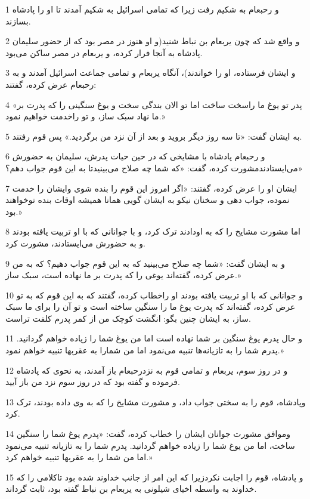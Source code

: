 \par 1 و رحبعام به شکیم رفت زیرا که تمامی اسرائیل به شکیم آمدند تا او را پادشاه بسازند.
\par 2 و واقع شد که چون یربعام بن نباط شنید(و او هنوز در مصر بود که از حضور سلیمان پادشاه به آنجا فرار کرده، و یربعام در مصر ساکن می‌بود.
\par 3 و ایشان فرستاده، او را خواندند)، آنگاه یربعام و تمامی جماعت اسرائیل آمدند و به رحبعام عرض کرده، گفتند:
\par 4 «پدر تو یوغ ما راسخت ساخت اما تو الان بندگی سخت و یوغ سنگینی را که پدرت بر ما نهاد سبک ساز، و تو راخدمت خواهیم نمود.»
\par 5 به ایشان گفت: «تا سه روز دیگر بروید و بعد از آن نزد من برگردید.» پس قوم رفتند.
\par 6 و رحبعام پادشاه با مشایخی که در حین حیات پدرش، سلیمان به حضورش می‌ایستادندمشورت کرده، گفت: «که شما چه صلاح می‌بینیدتا به این قوم جواب دهم؟»
\par 7 ایشان او را عرض کرده، گفتند: «اگر امروز این قوم را بنده شوی وایشان را خدمت نموده، جواب دهی و سخنان نیکو به ایشان گویی همانا همیشه اوقات بنده توخواهند بود.»
\par 8 اما مشورت مشایخ را که به اودادند ترک کرد، و با جوانانی که با او تربیت یافته بودند و به حضورش می‌ایستادند، مشورت کرد.
\par 9 و به ایشان گفت: «شما چه صلاح می‌بینید که به این قوم جواب دهیم؟ که به من عرض کرده، گفته‌اند یوغی را که پدرت بر ما نهاده است، سبک ساز.»
\par 10 و جوانانی که با او تربیت یافته بودند او راخطاب کرده، گفتند که به این قوم که به تو عرض کرده، گفته‌اند که پدرت یوغ ما را سنگین ساخته است و تو آن را برای ما سبک ساز، به ایشان چنین بگو: انگشت کوچک من از کمر پدرم کلفت تراست.
\par 11 و حال پدرم یوغ سنگین بر شما نهاده است اما من یوغ شما را زیاده خواهم گردانید. پدرم شما را به تازیانه‌ها تنبیه می‌نمود اما من شمارا به عقربها تنبیه خواهم نمود.»
\par 12 و در روز سوم، یربعام و تمامی قوم به نزدرحبعام باز آمدند، به نحوی که پادشاه فرموده و گفته بود که در روز سوم نزد من باز آیید.
\par 13 وپادشاه، قوم را به سختی جواب داد، و مشورت مشایخ را که به وی داده بودند، ترک کرد.
\par 14 وموافق مشورت جوانان ایشان را خطاب کرده، گفت: «پدرم یوغ شما را سنگین ساخت، اما من یوغ شما را زیاده خواهم گردانید. پدرم شما را به تازیانه تنبیه می‌نمود اما من شما را به عقربها تنبیه خواهم کرد.»
\par 15 و پادشاه، قوم را اجابت نکردزیرا که این امر از جانب خداوند شده بود تاکلامی را که خداوند به واسطه اخیای شیلونی به یربعام بن نباط گفته بود، ثابت گرداند.
